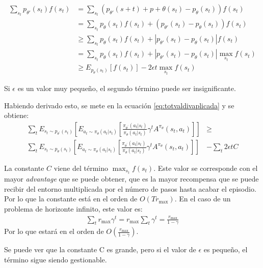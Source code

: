 \begin{align}
    \sum_{s_t}p_{\theta'}(s_t)f(s_t)&=\sum_{s_t}(p_{\theta'}(s+t)+p+\theta(s_t)-p_\theta(s_t))f(s_t)\\
&=\sum_{s_t}p_\theta(s_t)f(s_t)+(p_{\theta'}(s_t)-p_\theta(s_t))f(s_t)\\
&\geq\sum_{s_t}p_\theta(s_t)f(s_t)+|p_{\theta'}(s_t)-p_\theta(s_t)|f(s_t)\\
&=\sum_{s_t}p_\theta(s_t)f(s_t)+|p_{\theta'}(s_t)-p_\theta(s_t)|\max_{s_t}f(s_t)\\
&\geq E_{p_\theta(s_t)}\left[f(s_t)\right]-2\epsilon t \max_{s_t} f(s_t)
\end{align}

Si $\epsilon$ es un valor muy pequeño, el segundo término puede ser insignificante.

Habiendo derivado esto, se mete en la ecuación \ref{eq:totvaldivaplicada} y se obtiene:
\begin{align}
\sum _ { t } E _ { s _ { t } \sim p _ { \theta ^ { \prime } } ( s _ { t } ) } \left[ E _ { a _ { t }
\sim \pi _ { \theta } ( a _ { t } | s _ { t } ) } \left[ \frac { \pi _ { \theta ^ { \prime } } ( a _ {
t } | s _ { t } ) } { \pi _ { \theta } ( a _ { t } | s _ { t } ) } \gamma ^ { t } A ^ { \pi _ {
\theta } } ( s _ { t } , a _ { t } ) \right] \right] &\geq\\
\sum _ { t } E _ { s _ { t } \sim p _ { \theta } ( s _ { t } ) } \left[ E _ { a _ { t } \sim \pi _ {
\theta } ( a _ { t } | s _ { t } ) } \left[ \frac { \pi _ { \theta ^ { \prime } } ( a _ { t } | s _ {
t } ) } { \pi _ { \theta } ( a _ { t } | s _ { t } ) } \gamma ^ { t } A ^ { \pi _ { \theta } } (
s _ { t } , a _ { t } ) \right] \right] &- \sum _ { t } 2 \epsilon t C
\end{align}

La constante $C$ viene del término $\max_{s_t}f(s_t)$. Este valor se corresponde con el
mayor  \textit{advantage} que se puede obtener, que es la mayor recompensa que se puede recibir
del entorno multiplicada por el número de pasos hasta acabar el episodio. Por lo que la
constante está en el orden de $O(Tr_{\max})$. En el caso de un problema de horizonte infinito,
este valor es:
\begin{align}
    \sum_t r_{\max}\gamma^t=r_{\max}\sum_t \gamma^t= \frac{r_{\max}}{1-\gamma} 
\end{align}
Por lo que estará en el orden de $O(\frac{r_{\max}}{1-\gamma})$.

Se puede ver que la constante C es grande, pero si el valor de $\epsilon$ es pequeño, el término
sigue siendo gestionable.

